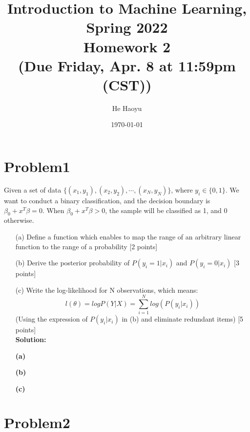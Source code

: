 \documentclass[10pt]{article}
\author{He Haoyu}
\begin{document}
\date{\today}
\title{Introduction to Machine Learning, Spring 2022 \\
Homework 2\\
\small (Due Friday, Apr. 8 at 11:59pm (CST))}
\maketitle


\section{Problem1}
Given a set of data $\{(x_1, y_1), (x_2, y_2), \cdots, (x_N, y_N)\}$, where $y_i \in \{0, 1\}$. We want to conduct a binary classification, and the decision boundary is $\beta_0 + x^T\beta = 0$. When $\beta_0 + x^T\beta > 0$, the sample will be classified as 1, and 0 otherwise. 

\begin{enumerate}

\item[(a)]
Define a function which enables to map the range of an arbitrary linear function to the range of a probability {\color{red} [2 points]}\\

\item[(b)]
Derive the posterior probability of $P(y_i=1 | x_i)$ and $P(y_i=0 | x_i)$ {\color{red} [3 points]}\\

\item[(c)]
Write the log-likelihood for N observations, which means:
$$l(\theta) = logP(Y|X) = \sum_{i=1}^Nlog(P(y_i|x_i))$$
(Using the expression of $P(y_i|x_i)$ in (b) and eliminate redundant items) {\color{red} [5 points]}\\
\textbf{Solution:}

  \item[\textbf{(a)}]
 
	\item[\textbf{(b)}] 

	\item[\textbf{(c)}] 
\end{enumerate}
\newpage
\section{Problem2}
\end{document}
